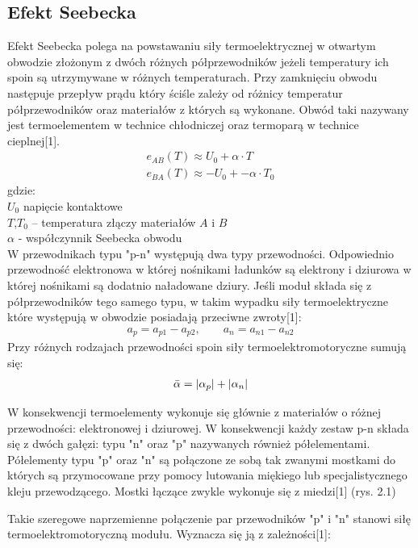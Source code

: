 \documentclass[oneside]{mgr}
\begin{document}
\subsection{Efekt Seebecka}
Efekt Seebecka polega na powstawaniu siły termoelektrycznej w otwartym obwodzie złożonym z dwóch różnych półprzewodników jeżeli temperatury ich spoin są utrzymywane w różnych temperaturach. Przy zamknięciu obwodu następuje przepływ prądu który ściśle zależy od różnicy temperatur półprzewodników oraz materiałów z których są wykonane. Obwód taki nazywany jest termoelementem w technice chłodniczej oraz termoparą w technice cieplnej[1].
\begin{eqnarray}
    e_{AB}(T) \approx U_0 + \alpha \cdot T\\
    e_{BA}(T) \approx -U_0 + -\alpha \cdot T_0 \nonumber
\end{eqnarray}
gdzie: \\
$U_0$ napięcie kontaktowe \\
$T$,$T_0$ – temperatura złączy materiałów $A$ i $B$ \\
$\alpha$ - współczynnik Seebecka obwodu \\

W przewodnikach typu "p-n" występują dwa typy przewodności. Odpowiednio przewodność elektronowa w której nośnikami ładunków są elektrony i dziurowa w której nośnikami są dodatnio naładowane dziury. Jeśli moduł składa się z półprzewodników tego samego typu, w takim wypadku siły termoelektryczne które występują w obwodzie posiadają przeciwne zwroty[1]:
\begin{eqnarray}
    a_p=a_{p1}-a_{p2}, \qquad a_n=a_{n1}-a_{n2}
\end{eqnarray}
Przy różnych rodzajach przewodności spoin siły termoelektromotoryczne sumują się:
\begin{eqnarray}
    \Bar{\alpha}=|\alpha_p|+|\alpha_n|
\end{eqnarray}

W konsekwencji termoelementy wykonuje się głównie z materiałów o różnej przewodności: elektronowej i dziurowej. W konsekwencji każdy zestaw p-n składa się z dwóch gałęzi: typu "n" oraz "p" nazywanych również półelementami. Półelementy typu "p" oraz "n" są połączone ze sobą tak zwanymi mostkami do których są przymocowane przy pomocy lutowania miękiego lub specjalistycznego kleju przewodzącego. Mostki łączące zwykle wykonuje się z miedzi[1] (rys. 2.1)

Takie szeregowe naprzemienne połączenie par przewodników "p" i "n" stanowi siłę termoelektromotoryczną modułu. Wyznacza się ją z zależności[1]:
\end{document}
